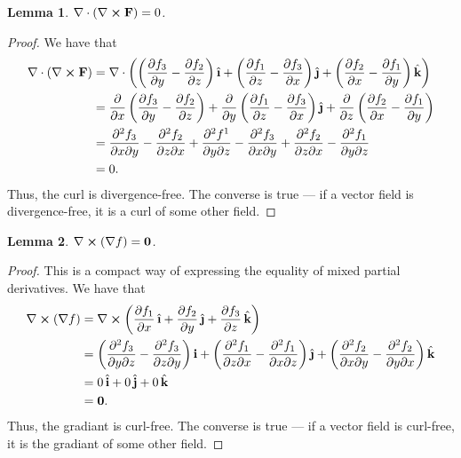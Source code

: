 \documentclass[11pt]{article}
\newtheorem*{lemma*}{Lemma}
\renewcommand{\vec}[1]{\mathbf{#1}}
\newcommand{\uvec}[1]{\mathop{} \!\hat{\textbf{#1}}}
\renewcommand{\div}{\nabla \cdot}
\renewcommand{\curl}{\nabla \cross}
\renewcommand{\grad}{\nabla}
\begin{document}
\begin{lemma*}
	$\div (\curl \mathbf{F}) = 0$.
\end{lemma*}
\begin{adjustwidth}{0.7cm}{}
    \begin{proof}\renewcommand{\qedsymbol}{}
		We have that		
		\begin{align*}
			\div (\curl \mathbf{F}) &= \div \left(\left( \pdv{f_{3}}{y} - \pdv{f_{2}}{z} \right) \uvec{\i} + \left( \pdv{f_{1}}{z} - \pdv{f_{3}}{x} \right) \uvec{\j} + \left( \pdv{f_{2}}{x} - \pdv{f_{1}}{y} \right) \uvec{k} \right) \\
			&= \pdv{x} \left( \pdv{f_{3}}{y} - \pdv{f_{2}}{z} \right) + \pdv{y} \left( \pdv{f_{1}}{z} - \pdv{f_{3}}{x} \right) \uvec{\j} + \pdv{z} \left( \pdv{f_{2}}{x} - \pdv{f_{1}}{y} \right) \\
			&= \pdv[2]{f_{3}}{x}{y} - \pdv[2]{f_{2}}{z}{x} + \pdv[2]{f^{1}}{y}{z} - \pdv[2]{f_{3}}{x}{y} + \pdv[2]{f_{2}}{z}{x} - \pdv[2]{f_{1}}{y}{z} \\
			&= 0.
		\end{align*}
		Thus, the curl is divergence-free. The converse is true --- if a vector field is divergence-free, it is a curl of some other field.
	\end{proof}
\end{adjustwidth}

\begin{lemma*}
	$\curl (\grad f) = \vec{0}$.
\end{lemma*}
\begin{adjustwidth}{0.7cm}{}
    \begin{proof}\renewcommand{\qedsymbol}{}
		This is a compact way of expressing the equality of mixed partial derivatives. We have that		
		\begin{align*}
			\curl (\grad f) &= \curl \left( \pdv{f_{1}}{x} \uvec{\i} + \pdv{f_{2}}{y} \uvec{\j} + \pdv{f_{3}}{z} \uvec{k} \right) \\
			&= \left( \pdv[2]{f_{3}}{y}{z} - \pdv[2]{f_{3}}{z}{y} \right) \vec{i} + \left( \pdv[2]{f_{1}}{z}{x} - \pdv[2]{f_{1}}{x}{z} \right) \uvec{\j} + \left( \pdv[2]{f_{2}}{x}{y} - \pdv[2]{f_{2}}{y}{x} \right) \uvec{k} \\
			&= 0 \uvec{i} + 0 \uvec{j} + 0 \uvec{k} \\
			&= \vec{0}.
		\end{align*}
		Thus, the gradiant is curl-free. The converse is true --- if a vector field is curl-free, it is the gradiant of some other field.
	\end{proof}
\end{adjustwidth}
\end{document}
